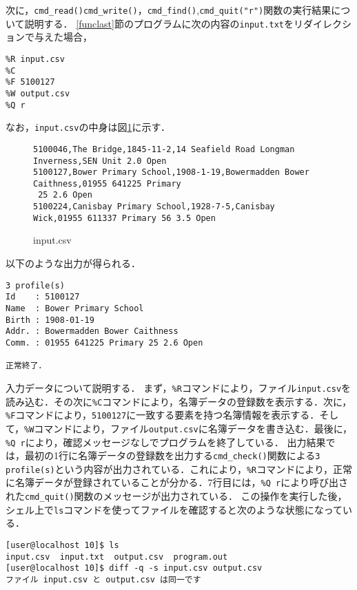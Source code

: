 次に，\verb|cmd_read()|\verb|cmd_write()|，\verb|cmd_find()|,\verb|cmd_quit("r")|関数の実行結果について説明する．
\ref{funclast}節のプログラムに次の内容の\verb|input.txt|をリダイレクションで与えた場合，

{\fontsize{10pt}{11pt} \selectfont
 \begin{verbatim}
%R input.csv
%C
%F 5100127
%W output.csv
%Q r
 \end{verbatim}
}

\noindent
なお，\verb|input.csv|の中身は図\ref{input.csv}に示す．
\begin{figure}[b]
{\fontsize{10pt}{11pt} \selectfont
 \begin{verbatim}
5100046,The Bridge,1845-11-2,14 Seafield Road Longman Inverness,SEN Unit 2.0 Open
5100127,Bower Primary School,1908-1-19,Bowermadden Bower Caithness,01955 641225 Primary
 25 2.6 Open
5100224,Canisbay Primary School,1928-7-5,Canisbay Wick,01955 611337 Primary 56 3.5 Open
 \end{verbatim}
}
\caption{input.csv}
\label{input.csv}
\end{figure}

\noindent %
以下のような出力が得られる．

{\fontsize{10pt}{11pt} \selectfont
 \begin{verbatim}
3 profile(s)
Id    : 5100127
Name  : Bower Primary School
Birth : 1908-01-19
Addr. : Bowermadden Bower Caithness
Comm. : 01955 641225 Primary 25 2.6 Open

正常終了．
 \end{verbatim}
}

入力データについて説明する．
まず，\verb|%R|コマンドにより，ファイル\verb|input.csv|を読み込む．その次に\verb|%C|コマンドにより，名簿データの登録数を表示する．次に，\verb|%F|コマンドにより，\verb|5100127|に一致する要素を持つ名簿情報を表示する．そして，\verb|%W|コマンドにより，ファイル\verb|output.csv|に名簿データを書き込む．最後に，\verb|%Q r|により，確認メッセージなしでプログラムを終了している．
出力結果では，最初の1行に名簿データの登録数を出力する\verb|cmd_check()|関数による\verb|3 profile(s)|という内容が出力されている．これにより，\verb|%R|コマンドにより，正常に名簿データが登録されていることが分かる．7行目には，\verb|%Q r|により呼び出された\verb|cmd_quit()|関数のメッセージが出力されている．
この操作を実行した後，シェル上で\verb|ls|コマンドを使ってファイルを確認すると次のような状態になっている．

{\fontsize{10pt}{11pt} \selectfont
 \begin{verbatim}
[user@localhost 10]$ ls
input.csv  input.txt  output.csv  program.out
[user@localhost 10]$ diff -q -s input.csv output.csv
ファイル input.csv と output.csv は同一です
 \end{verbatim}
}

